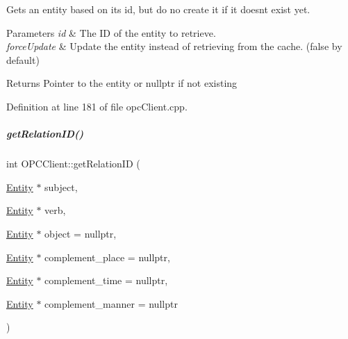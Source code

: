 Gets an entity based on its id, but do no create it if it doesn\textquotesingle{}t exist yet. 


\begin{DoxyParams}{Parameters}
{\em id} & The ID of the entity to retrieve. \\
\hline
{\em force\+Update} & Update the entity instead of retrieving from the cache. (false by default) \\
\hline
\end{DoxyParams}
\begin{DoxyReturn}{Returns}
Pointer to the entity or nullptr if not existing 
\end{DoxyReturn}


Definition at line 181 of file opc\+Client.\+cpp.

\mbox{\label{group__icubclient__clients_a3dbf81c34467613af606013e45042f01}} 
\subparagraph{\texorpdfstring{get\+Relation\+I\+D()}{getRelationID()}}
{\footnotesize\ttfamily int O\+P\+C\+Client\+::get\+Relation\+ID (\begin{DoxyParamCaption}\item[{\hyperlink{group__icubclient__representations_classicubclient_1_1Entity}{Entity} $\ast$}]{subject,  }\item[{\hyperlink{group__icubclient__representations_classicubclient_1_1Entity}{Entity} $\ast$}]{verb,  }\item[{\hyperlink{group__icubclient__representations_classicubclient_1_1Entity}{Entity} $\ast$}]{object = {\ttfamily nullptr},  }\item[{\hyperlink{group__icubclient__representations_classicubclient_1_1Entity}{Entity} $\ast$}]{complement\+\_\+place = {\ttfamily nullptr},  }\item[{\hyperlink{group__icubclient__representations_classicubclient_1_1Entity}{Entity} $\ast$}]{complement\+\_\+time = {\ttfamily nullptr},  }\item[{\hyperlink{group__icubclient__representations_classicubclient_1_1Entity}{Entity} $\ast$}]{complement\+\_\+manner = {\ttfamily nullptr} }\end{DoxyParamCaption})\hspace{0.3cm}{\ttfamily [protected]}}



